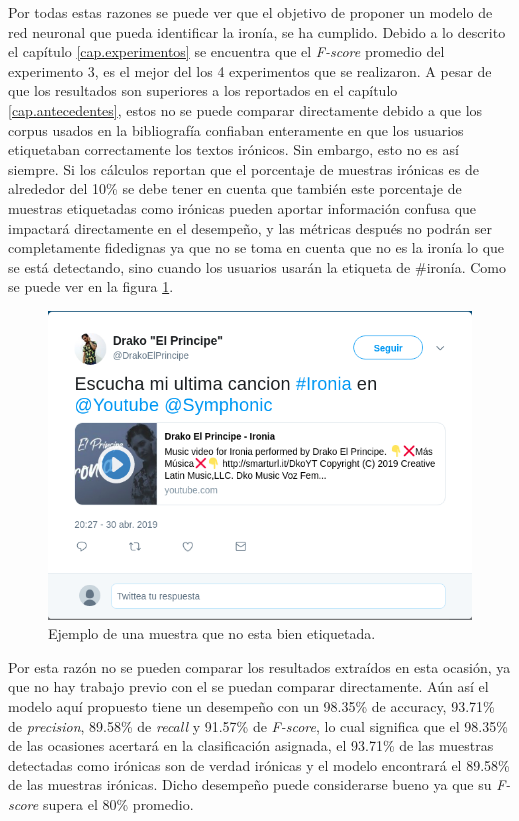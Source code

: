 		\par Por todas estas razones se puede ver que el objetivo de proponer un modelo de red neuronal que pueda identificar la ironía, se ha cumplido. Debido a lo descrito el capítulo \ref{cap.experimentos} se encuentra que el \textit{F-score} promedio del experimento 3, es el mejor del los 4 experimentos que se realizaron. A pesar de que los resultados son superiores a los reportados en el capítulo \ref{cap.antecedentes}, estos no se puede comparar directamente debido a que los corpus usados en la bibliografía confiaban enteramente en que los usuarios etiquetaban correctamente los textos irónicos. Sin embargo, esto no es así siempre. Si los cálculos reportan que el porcentaje de muestras irónicas es de alrededor del 10\% se debe tener en cuenta que también este porcentaje de muestras etiquetadas como irónicas pueden aportar información confusa que impactará directamente en el desempeño, y las métricas después no podrán ser completamente fidedignas ya que no se toma en cuenta que no es la ironía lo que se está detectando, sino cuando los usuarios usarán la etiqueta de \#ironía. Como se puede ver en la figura \ref{fig:ejemploNoironia}. 
		\begin{figure}
		    \centering
		    \includegraphics[width=\linewidth]{imagenes/ejemploIroniaNoironia.png}
		    \caption{Ejemplo de una muestra que no esta bien etiquetada.}
		    \label{fig:ejemploNoironia}
		\end{figure}
		
		\par Por esta razón no se pueden comparar los resultados extraídos en esta ocasión, ya que no hay trabajo previo con el se puedan comparar directamente. Aún así el modelo aquí propuesto  tiene un desempeño con un 98.35\% de accuracy, 93.71\% de \textit{precision}, 89.58\% de \textit{recall} y 91.57\% de \textit{F-score}, lo cual significa que el 98.35\% de las ocasiones acertará en la clasificación asignada, el 93.71\% de las muestras detectadas como irónicas son de verdad irónicas y el modelo encontrará el 89.58\% de las muestras irónicas. Dicho desempeño puede considerarse bueno ya que su \textit{F-score} supera el 80\% promedio.
		
